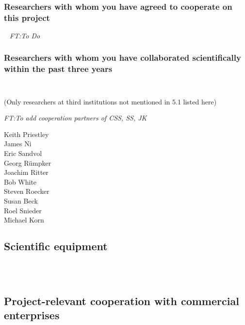 \documentclass[11pt]{article}
\providecommand{\currfilename}{}
\newcommand{\showfile}{{\bf \tt \color{blue} \currfilename}}
\newcommand{\noteft}[1]{{\it \color{magenta} FT:#1}}
\newcommand{\noteft}[1]{}
\newcommand{\showfile}{}
\begin{document}
\subsubsection{Researchers with whom you have agreed to cooperate on this project}
\showfile
\noteft{To Do}

\subsubsection{Researchers with whom you have collaborated scientifically within the past three years}
\showfile

{\footnotesize (Only researchers at third institutions not mentioned in 5.1 listed here)

\noteft{To add cooperation partners of CSS, SS, JK}
\begin{multicols}{4}
\begin{flushleft}
Keith Priestley\\
James Ni \\
Eric Sandvol\\
Georg Rümpker\\
Joachim Ritter\\
Bob White \\
Steven Roecker \\
Susan Beck\\
Roel Snieder\\
Michael Korn
\end{flushleft}
\end{multicols}

\subsection{Scientific equipment}
\\
\showfile


\subsection{Project-relevant cooperation with commercial enterprises}
\\
\showfile


}
\end{document}
